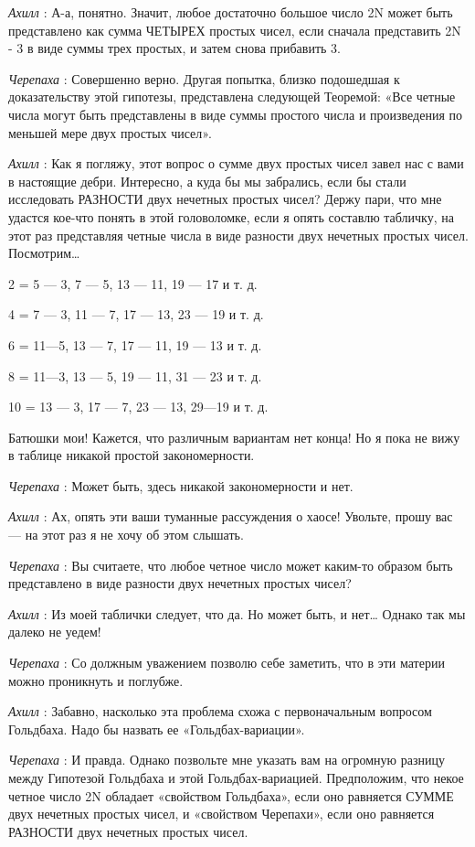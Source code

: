 \emph{Ахилл} : А-а, понятно. Значит, любое достаточно большое число 2N может быть представлено как сумма ЧЕТЫРЕХ простых чисел, если сначала представить 2N - 3 в виде суммы трех простых, и затем снова прибавить 3.

\emph{Черепаха} : Совершенно верно. Другая попытка, близко подошедшая к доказательству этой гипотезы, представлена следующей Теоремой: «Все четные числа могут быть представлены в виде суммы простого числа и произведения по меньшей мере двух простых чисел».

\emph{Ахилл} : Как я погляжу, этот вопрос о сумме двух простых чисел завел нас с вами в настоящие дебри. Интересно, а куда бы мы забрались, если бы стали исследовать РАЗНОСТИ двух нечетных простых чисел? Держу пари, что мне удастся кое-что понять в этой головоломке, если я опять составлю табличку, на этот раз представляя четные числа в виде разности двух нечетных простых чисел. Посмотрим\ldots{}

2 = 5 --- 3, 7 --- 5, 13 --- 11, 19 --- 17 и т. д.

4 = 7 --- 3, 11 --- 7, 17 --- 13, 23 --- 19 и т. д.

6 = 11---5, 13 --- 7, 17 --- 11, 19 --- 13 и т. д.

8 = 11---3, 13 --- 5, 19 --- 11, 31 --- 23 и т. д.

10 = 13 --- 3, 17 --- 7, 23 --- 13, 29---19 и т. д.

Батюшки мои! Кажется, что различным вариантам нет конца! Но я пока не вижу в таблице никакой простой закономерности.

\emph{Черепаха} : Может быть, здесь никакой закономерности и нет.

\emph{Ахилл} : Ах, опять эти ваши туманные рассуждения о хаосе! Увольте, прошу вас --- на этот раз я не хочу об этом слышать.

\emph{Черепаха} : Вы считаете, что любое четное число может каким-то образом быть представлено в виде разности двух нечетных простых чисел?

\emph{Ахилл} : Из моей таблички следует, что да. Но может быть, и нет\ldots{} Однако так мы далеко не уедем!

\emph{Черепаха} : Со должным уважением позволю себе заметить, что в эти материи можно проникнуть и поглубже.

\emph{Ахилл} : Забавно, насколько эта проблема схожа с первоначальным вопросом Гольдбаха. Надо бы назвать ее «Гольдбах-вариации».

\emph{Черепаха} : И правда. Однако позвольте мне указать вам на огромную разницу между Гипотезой Гольдбаха и этой Гольдбах-вариацией. Предположим, что некое четное число 2N обладает «свойством Гольдбаха», если оно равняется СУММЕ двух нечетных простых чисел, и «свойством Черепахи», если оно равняется РАЗНОСТИ двух нечетных простых чисел.

